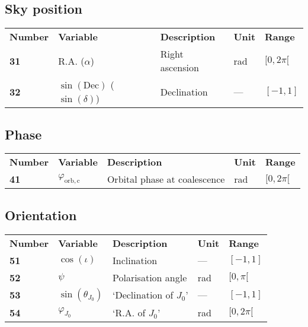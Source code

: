 \subsection{Sky position}
\begin{tabular}{lllll}
  \textbf{Number} & \textbf{Variable} & \textbf{Description} & \textbf{Unit} & \textbf{Range} \\
  \textbf{31} & R.A. ($\alpha$)  & Right ascension & rad & $[0,2\pi[$ \\
  \textbf{32} & $\sin(\mathrm{Dec})$ ($\sin(\delta)$)  & Declination & --- & $[-1,1]$ \\
\end{tabular}


\subsection{Phase}
\begin{tabular}{lllll}
  \textbf{Number} & \textbf{Variable} & \textbf{Description} & \textbf{Unit} & \textbf{Range} \\
  \textbf{41} & $\varphi_\mathrm{orb,c}$  & Orbital phase at coalescence & rad & $[0,2\pi[$ \\
\end{tabular}

\subsection{Orientation}
\begin{tabular}{lllll}
  \textbf{Number} & \textbf{Variable} & \textbf{Description} & \textbf{Unit} & \textbf{Range} \\
  \textbf{51} & $\cos(\iota)$  & Inclination & --- & $[-1,1]$ \\
  \textbf{52} & $\psi$  & Polarisation angle & rad & $[0,\pi[$ \\
  \textbf{53} & $\sin(\theta_{J_0})$ & `Declination of $J_0$' & --- & $[-1,1]$ \\
  \textbf{54} & $\varphi_{J_0}$  & `R.A. of $J_0$' & rad & $[0,2\pi[$ \\
\end{tabular}

